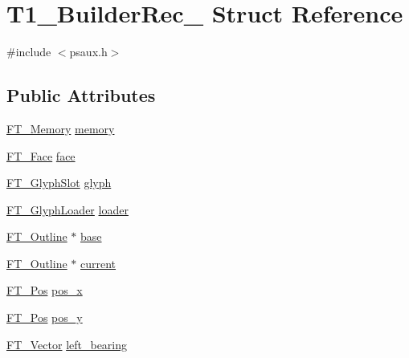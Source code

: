 \hypertarget{struct_t1___builder_rec__}{\section{T1\-\_\-\-Builder\-Rec\-\_\- Struct Reference}
\label{struct_t1___builder_rec__}
}


{\ttfamily \#include $<$psaux.\-h$>$}

\subsection*{Public Attributes}
\begin{DoxyCompactItemize}
\item 
\hyperlink{ftsystem_8h_a67ec7ea35cde99a89a65e9f827a9ad3a}{F\-T\-\_\-\-Memory} \hyperlink{struct_t1___builder_rec___abc49339af219c2a6310d16a19d277df3}{memory}
\item 
\hyperlink{freetype_8h_a7eba045ee20968354fa1bff0f69740fa}{F\-T\-\_\-\-Face} \hyperlink{struct_t1___builder_rec___a63764b21488527a39316aebeee9f98a2}{face}
\item 
\hyperlink{freetype_8h_a768daa0d9c3fa499e6c37034ee9f2ca3}{F\-T\-\_\-\-Glyph\-Slot} \hyperlink{struct_t1___builder_rec___a2382a6bc2256513f70bf959180f56e4c}{glyph}
\item 
\hyperlink{ftgloadr_8h_a2671bcb107327e81037ea42332454741}{F\-T\-\_\-\-Glyph\-Loader} \hyperlink{struct_t1___builder_rec___ae2202eaee7c0937435419d559374bd3c}{loader}
\item 
\hyperlink{ftimage_8h_a79cb182373b5aa3041955b19ce32afca}{F\-T\-\_\-\-Outline} $\ast$ \hyperlink{struct_t1___builder_rec___a6096f6eba85f91c3ac6dc270d8af464c}{base}
\item 
\hyperlink{ftimage_8h_a79cb182373b5aa3041955b19ce32afca}{F\-T\-\_\-\-Outline} $\ast$ \hyperlink{struct_t1___builder_rec___a6cabaa34c7f020e871a73a1b54371f98}{current}
\item 
\hyperlink{ftimage_8h_af5f230f4b253d4c7715fd2e595614c90}{F\-T\-\_\-\-Pos} \hyperlink{struct_t1___builder_rec___ad3e29097d00fa1941ac17273c1310a92}{pos\-\_\-x}
\item 
\hyperlink{ftimage_8h_af5f230f4b253d4c7715fd2e595614c90}{F\-T\-\_\-\-Pos} \hyperlink{struct_t1___builder_rec___ad389bf0d5182b677ed3dba05a9612530}{pos\-\_\-y}
\item 
\hyperlink{ftimage_8h_ab158b5a7e422acb1968af95db786d018}{F\-T\-\_\-\-Vector} \hyperlink{struct_t1___builder_rec___a86247b8fd87873ef93aecf0e27e4b6dc}{left\-\_\-bearing}

\end{DoxyCompactItemize}
